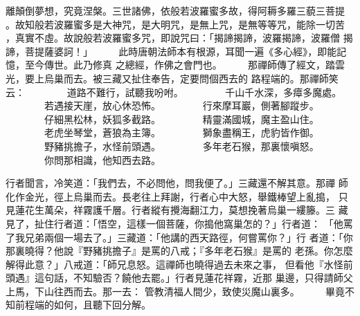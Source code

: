 \begin{pinyinscope}
{離顛倒夢想，究竟涅槃。三世諸佛，依般若波羅蜜多故，得阿耨多羅三藐三菩提
。故知般若波羅蜜多是大神咒，是大明咒，是無上咒，是無等等咒，能除一切苦
，真實不虛。故說般若波羅蜜多咒，即說咒曰：「揭諦揭諦，波羅揭諦，波羅僧
揭諦，菩提薩婆訶！」
　　
此時唐朝法師本有根源，耳聞一遍《多心經》，即能記憶，至今傳世。此乃修真
之總經，作佛之會門也。
　　
那禪師傳了經文，踏雲光，要上烏巢而去。被三藏又扯住奉告，定要問個西去的
路程端的。那禪師笑云：
　　　　道路不難行，試聽我吩咐。
　　　　千山千水深，多瘴多魔處。
　　　　若遇接天崖，放心休恐怖。
　　　　行來摩耳巖，側著腳蹤步。
　　　　仔細黑松林，妖狐多截路。
　　　　精靈滿國城，魔主盈山住。
　　　　老虎坐琴堂，蒼狼為主簿。
　　　　獅象盡稱王，虎豹皆作御。
　　　　野豬挑擔子，水怪前頭遇。
　　　　多年老石猴，那裏懷嗔怒。
　　　　你問那相識，他知西去路。

行者聞言，冷笑道：「我們去，不必問他，問我便了。」三藏還不解其意。那禪
師化作金光，徑上烏巢而去。長老往上拜謝，行者心中大怒，舉鐵棒望上亂搗，
只見蓮花生萬朵，祥霧護千層。行者縱有攪海翻江力，莫想挽著烏巢一縷籐。三
藏見了，扯住行者道：「悟空，這樣一個菩薩，你搗他窩巢怎的？」行者道：
「他罵了我兄弟兩個一場去了。」三藏道：「他講的西天路徑，何嘗罵你？」行
者道：「你那裏曉得？他說『野豬挑擔子』是罵的八戒；『多年老石猴』是罵的
老孫。你怎麼解得此意？」八戒道：「師兄息怒。這禪師也曉得過去未來之事，
但看他『水怪前頭遇』這句話，不知驗否？饒他去罷。」行者見蓮花祥霧，近那
巢邊，只得請師父上馬，下山往西而去。那一去：
管教清福人間少，致使災魔山裏多。
　　
    畢竟不知前程端的如何，且聽下回分解。





}
\end{pinyinscope}
